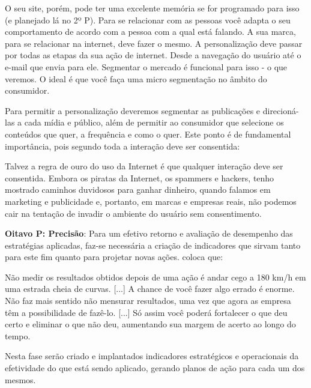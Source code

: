 \begin{citacao}
O seu site, porém, pode ter uma excelente memória se for programado para isso (e planejado lá no 2º P). Para se relacionar com as pessoas você adapta o seu comportamento de acordo com a pessoa com a qual está falando. A sua marca, para se relacionar na internet, deve fazer o mesmo. A personalização deve passar   por todas as etapas da sua ação de internet. Desde a navegação do usuário até o e-mail que  envia para ele. Segmentar o mercado é funcional para isso - o que veremos.  O ideal é que você faça uma micro segmentação no âmbito do consumidor.
\end{citacao}

Para permitir a personalização deveremos segmentar as publicações e direcioná-las a cada mídia e público, além de permitir ao consumidor que selecione os conteúdos que quer, a frequência e como o quer. Este ponto é de fundamental importância, pois segundo  toda a interação deve ser consentida:

\begin{citacao}
Talvez a regra de ouro do uso da Internet é que qualquer interação deve ser consentida. Embora os piratas da Internet, os spammers e hackers, tenho mostrado caminhos duvidosos para ganhar dinheiro, quando falamos em marketing e publicidade e, portanto, em marcas e empresas reais, não podemos cair na tentação de invadir o ambiente do usuário sem consentimento.
\end{citacao}

\textbf{Oitavo P: Precisão}: Para um efetivo retorno e avaliação de desempenho das estratégias aplicadas, faz-se necessária a criação de indicadores que sirvam tanto para este fim quanto para projetar novas ações.  coloca que:

\begin{citacao}
Não medir os resultados obtidos depois de uma ação é andar cego a 180 km/h em uma estrada cheia de curvas. [...] A chance de você fazer algo errado é enorme. Não faz mais sentido não mensurar resultados, uma vez que agora as empresa têm a possibilidade de fazê-lo. [...] Só assim você poderá fortalecer o que deu certo e eliminar o que não deu, aumentando sua margem de acerto ao longo do tempo.
\end{citacao}

Nesta fase serão criado e implantados indicadores estratégicos e operacionais da efetividade do que está sendo aplicado, gerando planos de ação para cada um dos mesmos.
